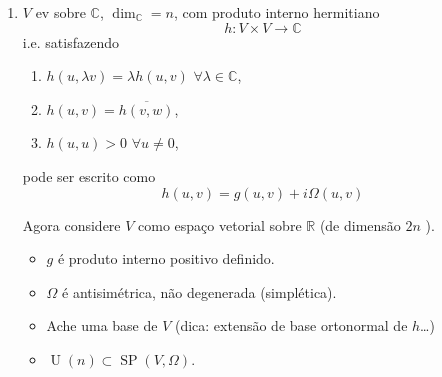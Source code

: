 \begin{example}
\begin{enumerate}
\begin{remark}
	Se $\{e_1,\ldots,e_n\} $ \'e uma base simpl\'etica de $W$ e $\{f_1,\ldots f_n\} $ \'e a base dual de $W^{*}$, ent\~ao
\[(W\oplus W^{*},\Omega_{?}\cong (\mathbb{R}^{2n},\Omega_0).\]
\end{remark}

Note que ainda que dado 
\[A:W\overset{\sim}{\to}W\]
automorfismo ?,
\[T_{A}:=\begin{pmatrix}A&0\\0&(A^{*} )^{-1}\end{pmatrix}:W\oplus W^{*} \to W\oplus W^{*}\]
\'e simplectomorfismo, ($T_{A}=A\oplus (A^{*} )^{-1}$ ).

\paragraph{Moral:} $\operatorname{GL}(W)\hookrightarrow \operatorname{Sp}(W\oplus W^{*} )$ 
\begin{align*}
	EV&\overset{\text{funtor} }{\rightsquigarrow}EVS\\
	A\circlearrowleft W&\longmapsto W\oplus W^{*} \circlearrowright T_{A}
\end{align*}

\item $V$ ev sobre $\mathbb{C}$, $\dim_{\mathbb{C}}=n$, com produto interno hermitiano
	\[h:V\times V\to \mathbb{C}\]
i.e. satisfazendo
\begin{enumerate}
	\item $h(u,\lambda v)=\lambda h(u,v)$  $\forall \lambda\in \mathbb{C}$,
	\item $h(u,v)=\overline{h(v,w)}$,
	\item $h(u,u)>0$ $\forall u\neq 0$,
\end{enumerate}
pode ser escrito como
\[h(u,v)=g(u,v)+i\Omega(u,v)\]

Agora considere $V$ como espa\c co vetorial sobre $\mathbb{R}$ (de dimens\~ao $2n$ ).

\begin{exercise}\leavevmode 
	\begin{itemize}
		\item $g$ \'e produto interno positivo definido.
		\item $\Omega$ \'e antisim\'etrica, n\~ao degenerada (simpl\'etica).
		\item Ache uma base de $V$ (dica: extens\~ao de base ortonormal de $h$…)
		\item $\operatorname{U}(n)\subset \operatorname{SP}(V,\Omega)$.
	\end{itemize}
\end{exercise}


\end{enumerate}
\end{example}
